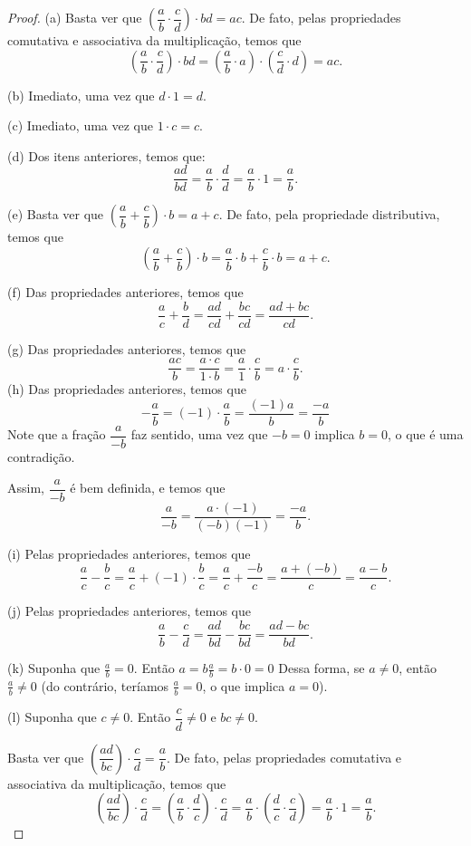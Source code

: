 \begin{proof}\hfill
    (a) Basta ver que $\left(\dfrac{a}{b}\cdot \dfrac{c}{d}\right)\cdot bd = ac$.
    De fato, pelas propriedades comutativa e associativa da multiplicação, temos que
    \[
    \left(\dfrac{a}{b}\cdot \dfrac{c}{d}\right)\cdot bd = \left(\dfrac{a}{b} \cdot a\right) \cdot \left(\dfrac{c}{d}\cdot d\right) = ac.
    \]

    (b) Imediato, uma vez que $d\cdot 1=  d$.

    (c) Imediato, uma vez que $1\cdot c = c$.

    (d) Dos itens anteriores, temos que:
    \[
    \dfrac{ad}{bd} = \dfrac{a}{b}\cdot \dfrac{d}{d} = \dfrac{a}{b}\cdot 1 = \dfrac{a}{b}.
    \]

    (e) Basta ver que $\left(\dfrac{a}{b} + \dfrac{c}{b}\right)\cdot b = a+c$.
    De fato, pela propriedade distributiva, temos que
    \[
    \left(\dfrac{a}{b} + \dfrac{c}{b}\right)\cdot b = \dfrac{a}{b}\cdot b + \dfrac{c}{b}\cdot b = a+c.
    \]

    (f) Das propriedades anteriores, temos que
    \[
        \dfrac{a}{c} + \dfrac{b}{d} = \dfrac{ad}{cd} + \dfrac{bc}{cd} = \dfrac{ad + bc}{cd}.
    \]

    (g) Das propriedades anteriores, temos que
    \[
        \dfrac{ac}{b} = \dfrac{a\cdot c}{1\cdot b} = \dfrac{a}{1}\cdot \dfrac{c}{b} = a\cdot \dfrac{c}{b}.
    \]
    (h) Das propriedades anteriores, temos que
    \[
        -\dfrac{a}{b} = (-1)\cdot \dfrac{a}{b} = \dfrac{(-1)a}{b} = \dfrac{-a}{b}
    \]
    Note que a fração $\dfrac{a}{-b}$ faz sentido, uma vez que $-b=0$ implica $b=0$, o que é uma contradição.
    
    Assim, $\dfrac{a}{-b}$ é bem definida, e temos que
    \[
        \dfrac{a}{-b} = \dfrac{a\cdot (-1)}{(-b)(-1)} = \dfrac{-a}{b}.
    \]

    (i) Pelas propriedades anteriores, temos que
    \[
        \dfrac{a}{c} - \dfrac{b}{c} = \dfrac{a}{c} + (-1)\cdot \dfrac{b}{c} = \dfrac{a}{c} + \dfrac{-b}{c} = \dfrac{a+(-b)}{c}=\dfrac{a-b}{c}.
    \]

    (j) Pelas propriedades anteriores, temos que
    \[
        \dfrac{a}{b} - \dfrac{c}{d} = \dfrac{ad}{bd} - \dfrac{bc}{bd} = \dfrac{ad - bc}{bd}.
    \]

    (k) Suponha que $\frac{a}{b}=0$.
    Então $a=b\frac{a}{b}=b\cdot 0=0$
    Dessa forma, se $a\neq 0$, então $\frac{a}{b}\neq 0$ (do contrário, teríamos $\frac{a}{b}=0$, o que implica $a=0$).

    (l) Suponha que $c\neq 0$.
    Então $\dfrac{c}{d}\neq 0$ e $bc\neq 0$.

    Basta ver que $\left(\dfrac{ad}{bc}\right)\cdot \dfrac{c}{d} = \dfrac{a}{b}$.
    De fato, pelas propriedades comutativa e associativa da multiplicação, temos que
    \[
        \left(\dfrac{ad}{bc}\right)\cdot \dfrac{c}{d} = \left(\dfrac{a}{b}\cdot \dfrac{d}{c}\right)\cdot \dfrac{c}{d} = \dfrac{a}{b}\cdot \left(\dfrac{d}{c}\cdot \dfrac{c}{d}\right) = \dfrac{a}{b}\cdot 1 = \dfrac{a}{b}.
    \]
\end{proof}


